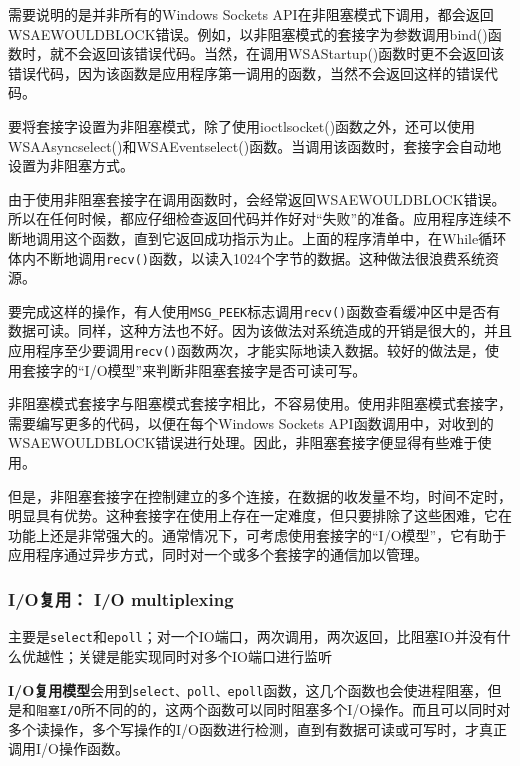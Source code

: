 \documentclass[UTF8,a4paper,8pt]{ctexbook}
\begin{document}
			需要说明的是并非所有的Windows Sockets API在非阻塞模式下调用，都会返回WSAEWOULDBLOCK错误。例如，以非阻塞模式的套接字为参数调用bind()函数时，就不会返回该错误代码。当然，在调用WSAStartup()函数时更不会返回该错误代码，因为该函数是应用程序第一调用的函数，当然不会返回这样的错误代码。
			
			要将套接字设置为非阻塞模式，除了使用ioctlsocket()函数之外，还可以使用WSAAsyncselect()和WSAEventselect()函数。当调用该函数时，套接字会自动地设置为非阻塞方式。
			
			
			由于使用非阻塞套接字在调用函数时，会经常返回WSAEWOULDBLOCK错误。所以在任何时候，都应仔细检查返回代码并作好对“失败”的准备。应用程序连续不断地调用这个函数，直到它返回成功指示为止。上面的程序清单中，在While循环体内不断地调用\verb|recv()|函数，以读入1024个字节的数据。这种做法很浪费系统资源。
			
			要完成这样的操作，有人使用\verb|MSG_PEEK|标志调用\verb|recv()|函数查看缓冲区中是否有数据可读。同样，这种方法也不好。因为该做法对系统造成的开销是很大的，并且应用程序至少要调用\verb|recv()|函数两次，才能实际地读入数据。较好的做法是，使用套接字的“I/O模型”来判断非阻塞套接字是否可读可写。
			
			非阻塞模式套接字与阻塞模式套接字相比，不容易使用。使用非阻塞模式套接字，需要编写更多的代码，以便在每个Windows Sockets API函数调用中，对收到的WSAEWOULDBLOCK错误进行处理。因此，非阻塞套接字便显得有些难于使用。
			
			但是，非阻塞套接字在控制建立的多个连接，在数据的收发量不均，时间不定时，明显具有优势。这种套接字在使用上存在一定难度，但只要排除了这些困难，它在功能上还是非常强大的。通常情况下，可考虑使用套接字的“I/O模型”，它有助于应用程序通过异步方式，同时对一个或多个套接字的通信加以管理。
			
			\subsubsection{I/O复用： I/O multiplexing}
			主要是\verb|select|和\verb|epoll|；对一个IO端口，两次调用，两次返回，比阻塞IO并没有什么优越性；关键是能实现同时对多个IO端口进行监听
			
			\textbf{I/O复用模型}会用到\verb|select、poll、epoll|函数，这几个函数也会使进程阻塞，但是和\verb|阻塞I/O|所不同的的，这两个函数可以同时阻塞多个I/O操作。而且可以同时对多个读操作，多个写操作的I/O函数进行检测，直到有数据可读或可写时，才真正调用I/O操作函数。
			
\end{document}
